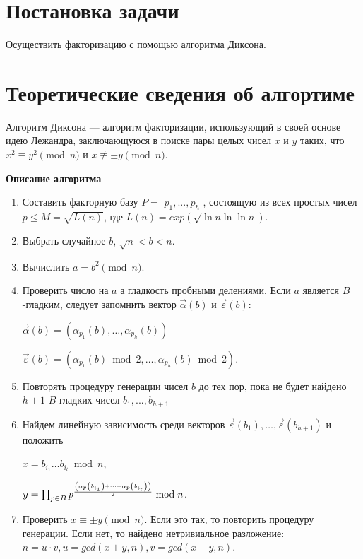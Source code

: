 \documentclass[spec, och, labwork]{shiza}
\begin{document}
\tableofcontents

\section{Постановка задачи}

Осуществить факторизацию с помощью алгоритма Диксона.

\section{Теоретические сведения об алгортиме}

Алгоритм Диксона — алгоритм факторизации, использующий 
в своей основе идею Лежандра, заключающуюся в поиске 
пары целых чисел $x$ и $y$ таких, что $x^2 \equiv y^2\pmod{n}$ и 
$x \not\equiv \pm y\pmod{n}$.

\textbf{Описание алгоритма}
\begin{enumerate}
    \item Составить факторную базу $P = $ {$p_1, ..., p_h$} , состоящую из всех простых чисел
    $p \leq M = \sqrt{L(n)}$, где $L(n) = exp(\sqrt{\ln{n}\ln{\ln{n}}})$.
    \item Выбрать случайное $b$, $\sqrt{n} < b < n$.
    \item Вычислить $a = b^2 \pmod{n}$.
    \item Проверить число на $a$ а гладкость пробными делениями. Если
    $a$ является $B$-гладким, следует запомнить вектор $\vec{\alpha}\left({b}\right)$ и 
    $\vec{\varepsilon}\left({b}\right)$:

    $\vec{\alpha}\left({b}\right)=\left({\alpha_{p_1}\left({b}\right), \dots, \alpha_{p_h}\left({b}\right)}\right)$
    
    $\vec{\varepsilon}\left({b}\right)=\left({\alpha_{p_1}\left({b}\right)\bmod{2}, \dots, \alpha_{p_h}\left({b}\right)\bmod{2}}\right)$.
    \item Повторять процедуру генерации чисел $b$ до тех пор, пока не будет найдено
    $h+1$ $B$-гладких чисел $b_1, ..., b_{h+1}$
    \item Найдем линейную зависимость среди векторов $\vec{\varepsilon}\left({b_1}\right), \dots, \vec{\varepsilon}\left({b_{h+1}}\right)$
    и положить 
    
    $x=b_{i_1} \dots b_{i_t}\bmod{n}$,

    $y=\prod_{p\in B}p^{\left({ \alpha_p\left({b_{i_1}}\right)+\dots+\alpha_p\left({b_{i_t}}\right) }\right) \over{2}}\bmod{n}$.

    \item Проверить $x \equiv \pm y \pmod{n}$. Если это так, то повторить процедуру генерации. Если нет, то найдено нетривиальное разложение:
    $n=u\cdot v,u=gcd\left({x+y,n}\right),v=gcd\left({x-y,n}\right)$.
\end{enumerate}
\end{document}
